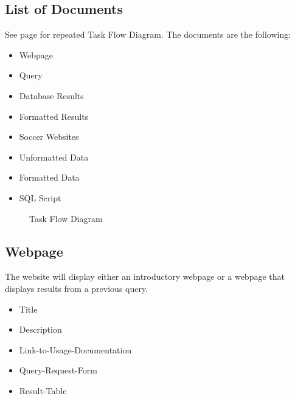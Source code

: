 \documentclass{article}
\begin{document}
\newpage

\subsection{List of Documents}
See page \pageref{taskflow2} for repeated Task Flow Diagram. The documents are the following:
\begin{itemize}
	\item Webpage
	\item Query 
	\item Database Results
	\item Formatted Results
	\item Soccer Websites
	\item Unformatted Data
	\item Formatted Data
	\item SQL Script
\end{itemize}

\begin{figure}[ph]
	\caption{Task Flow Diagram}
	\label{taskflow2}
\end{figure}

\clearpage

\subsection{Webpage}
The website will display either an introductory webpage or a webpage that
displays results from a previous query. 
\begin{itemize}
	\item Title
	\item Description
	\item Link-to-Usage-Documentation 
	\item Query-Request-Form
	\item Result-Table
\end{itemize}
\end{document}
